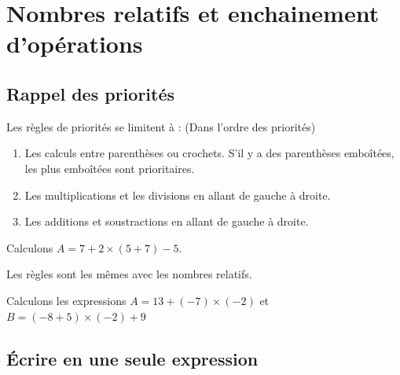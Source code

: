 \documentclass[a4paper,10pt]{report}
\begin{document}
\newpage
\setcounter{chapter}{4}
\chapter{Nombres relatifs et enchainement d'opérations}

\section{Rappel des priorités}

\vspace{-2mm}
\begin{prop}
Les règles de priorités se limitent à : (Dans l'ordre des priorités)
\begin{enumerate}
	\item Les calculs entre parenthèses ou crochets. S'il y a des parenthèses emboîtées, les plus emboîtées sont prioritaires.
	\item Les multiplications et les divisions en allant de gauche à droite.
	\item Les additions et soustractions en allant de gauche à droite.
\end{enumerate}
\end{prop}

\begin{meth}
Calculons $A = 7 + 2 \times (5 + 7) - 5$.
 
\noindent\grandscarreaux{\linewidth}{1.6cm}
\end{meth}

\begin{rem}

\vspace{-4mm}\hspace{3cm} Les règles sont les mêmes avec les nombres relatifs.
\end{rem}

\begin{ex}
Calculons les expressions \quad $A = 13 + (-7) \times (-2)$ \quad et \quad $B = (-8 + 5) \times (-2) + 9$

\noindent\grandscarreaux{\linewidth}{2.4cm}
\end{ex}

\vspace{-3mm}
\section{Écrire en une seule expression}
\end{document}
